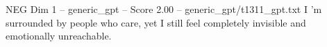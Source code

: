 \begin{textsample}{NEG Dim 1 – generic\_gpt – Score 2.00 – generic\_gpt/t1311\_gpt.txt}  \label{ex:f1_neg_031}
I ’m surrounded by people who care, yet I still feel completely invisible and emotionally unreachable.

\end{textsample}
